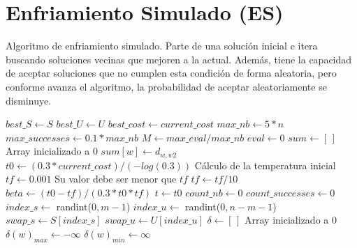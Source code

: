 \section{Enfriamiento Simulado (ES)}
\begin{algorithm}[H]
\caption{Algoritmo de enfriamiento simulado. Parte de una solución inicial e itera buscando soluciones vecinas que mejoren a la actual. Además, tiene la capacidad de aceptar soluciones que no cumplen esta condición de forma aleatoria, pero conforme avanza el algoritmo, la probabilidad de aceptar aleatoriamente se disminuye.}
\begin{algorithmic}[1]
    \State $best\_S \leftarrow S$
    \State $best\_U \leftarrow U$
    \State $best\_cost \leftarrow current\_cost$
    \State
    \State $max\_nb \leftarrow 5*n$
    \State $max\_successes \leftarrow 0.1*max\_nb$
    \State $M \leftarrow max\_eval/max\_nb$
    \State $eval \leftarrow 0$
    \State
    \State $sum \gets [ \, ]$ \Comment Array inicializado a 0
            \State $sum[w] \leftarrow d_{w,w2}$
        \EndFor
    \EndFor
    \State
    \State $t0 \leftarrow (0.3*current\_cost)/(-log(0.3))$ \Comment Cálculo de la temperatura inicial
    \State $tf \leftarrow 0.001$
     \Comment Su valor debe ser menor que $tf$
        \State $tf \leftarrow tf/10$
    \EndWhile
    \State
    \State $beta \leftarrow (t0 - tf)/(0.3*t0*tf)$
    \State $t \leftarrow t0$
        \State $count\_nb \leftarrow 0$
        \State $count\_successes \leftarrow 0$
        \State
            \State $index\_s \leftarrow$ randint($0, m-1$)
            \State $index\_u \leftarrow$ randint($0, n-m-1$)
            \State $swap\_s \leftarrow S[index\_s]$
            \State $swap\_u \leftarrow U[index\_u]$
            \State
            \State $\delta \leftarrow [ \, ]$ \Comment Array inicializado a 0
            \State $\delta(w)_{max} \gets -\infty$
            \State $\delta(w)_{min} \gets \infty$
\end{algorithmic}
\end{algorithm}
            
